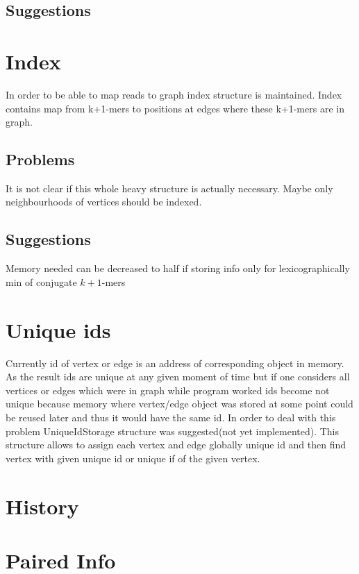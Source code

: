 \documentclass[14pt]{article}
\begin{document}
\subsection{Suggestions}

\section{Index}

In order to be able to map reads to graph index structure is maintained. Index contains map from k+1-mers to positions at edges where these k+1-mers are in graph.

\subsection{Problems}

It is not clear if this whole heavy structure is actually necessary. Maybe only neighbourhoods of vertices should be indexed.


\subsection{Suggestions}
Memory needed can be decreased to half if storing info only for lexicographically min of conjugate $k+1$-mers

\section{Unique ids}

Currently id of vertex or edge is an address of corresponding object in memory. As the result ids are unique at any given moment of time but if one considers all vertices or edges which were in graph while program worked ids become not unique because memory where vertex/edge object was stored at some point could be reused later and thus it would have the same id. In order to deal with this problem UniqueIdStorage structure was suggested(not yet implemented). This structure allows to assign each vertex and edge globally unique id and then find vertex with given unique id or unique if of the given vertex.

\section{History}

\section{Paired Info}
\end{document}
